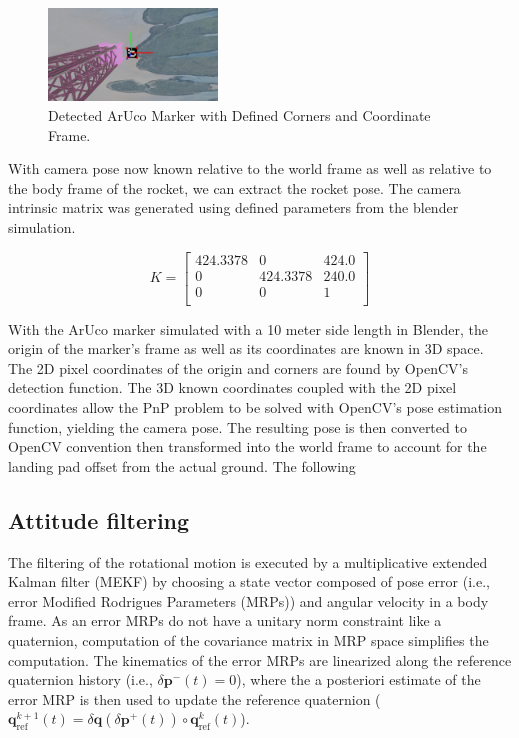 \documentclass[conference]{IEEEtran}
\begin{document}
\begin{figure}[ht!] 
    \centerline{\includegraphics[width=0.4\textwidth]{detectedMarker.png}}
    \caption{Detected ArUco Marker with Defined Corners and Coordinate Frame.}
    \label{fig:marker_}
\end{figure}

With camera pose now known relative to the world frame as well as relative to the body frame of the rocket, we can extract the rocket pose. 
The camera intrinsic matrix was generated using defined parameters from the blender simulation.

\[
K = \begin{bmatrix}
424.3378 & 0 & 424.0 \\
0 & 424.3378 & 240.0 \\
0 & 0 & 1 \\
\end{bmatrix}
\]

With the ArUco marker simulated with a 10 meter side length in Blender, the origin of the marker's frame as well as its coordinates are known in 3D space. 
The 2D pixel coordinates of the origin and corners are found by OpenCV's detection function. 
The 3D known coordinates coupled with the 2D pixel coordinates allow the PnP problem to be solved with OpenCV's pose estimation function, yielding the camera pose.
The resulting pose is then converted to OpenCV convention then transformed into the world frame to account for the landing pad offset from the actual ground.
The following 


\subsection{Attitude filtering}

The filtering of the rotational motion is executed by a multiplicative extended Kalman filter (MEKF) \cite{markley2003mekf} by choosing a state vector composed of pose error (i.e., error Modified Rodrigues Parameters (MRPs)) and angular velocity in a body frame.
As an error MRPs do not have a unitary norm constraint like a quaternion, computation of the covariance matrix in MRP space simplifies the computation. 
The kinematics of the error MRPs are linearized along the reference quaternion history (i.e., $\delta \boldsymbol{p}^{-}(t) = 0$), where the a posteriori estimate of the error MRP is then used to update the reference quaternion ($\boldsymbol{q}_{\text{ref}}^{k+1}(t) = \delta \boldsymbol{q}(\delta \boldsymbol{p}^{+}(t)) \circ \boldsymbol{q}_{\text{ref}}^k(t)$). 
\end{document}
